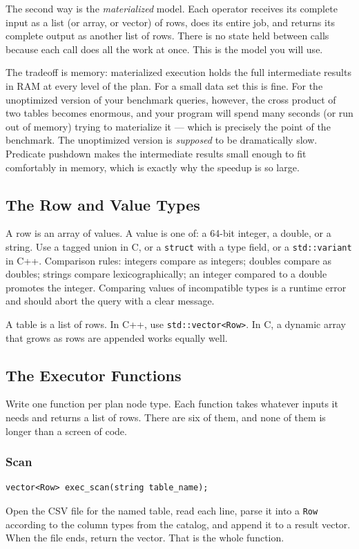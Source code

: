 \documentclass[11pt,a4paper]{article}
\begin{document}
The second way is the \textit{materialized} model. Each operator receives its complete input as a list (or array, or vector) of rows, does its entire job, and returns its complete output as another list of rows. There is no state held between calls because each call does all the work at once. This is the model you will use.

The tradeoff is memory: materialized execution holds the full intermediate results in RAM at every level of the plan. For a small data set this is fine. For the unoptimized version of your benchmark queries, however, the cross product of two tables becomes enormous, and your program will spend many seconds (or run out of memory) trying to materialize it --- which is precisely the point of the benchmark. The unoptimized version is \textit{supposed} to be dramatically slow. Predicate pushdown makes the intermediate results small enough to fit comfortably in memory, which is exactly why the speedup is so large.

\subsection{The Row and Value Types}
A row is an array of values. A value is one of: a 64-bit integer, a double, or a string. Use a tagged union in C, or a \texttt{struct} with a type field, or a \texttt{std::variant} in C++. Comparison rules: integers compare as integers; doubles compare as doubles; strings compare lexicographically; an integer compared to a double promotes the integer. Comparing values of incompatible types is a runtime error and should abort the query with a clear message.

A table is a list of rows. In C++, use \texttt{std::vector<Row>}. In C, a dynamic array that grows as rows are appended works equally well.

\subsection{The Executor Functions}
Write one function per plan node type. Each function takes whatever inputs it needs and returns a list of rows. There are six of them, and none of them is longer than a screen of code.

\subsubsection{Scan}
\begin{codebox}
\begin{lstlisting}
vector<Row> exec_scan(string table_name);
\end{lstlisting}
\end{codebox}
Open the CSV file for the named table, read each line, parse it into a \texttt{Row} according to the column types from the catalog, and append it to a result vector. When the file ends, return the vector. That is the whole function.
\end{document}
